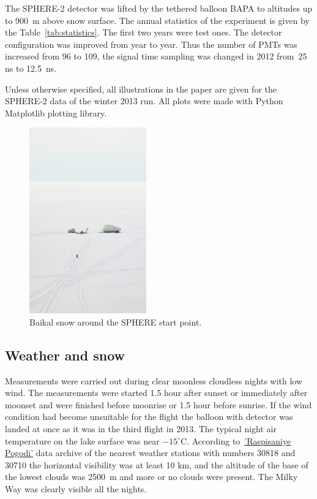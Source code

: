 \documentclass[final,5p,times,twocolumn]{elsarticle}
\begin{document}
The \mbox{SPHERE-2} detector was lifted by the tethered balloon BAPA to altitudes up to 900~m above snow surface. The annual statistics of the experiment is given by the Table~\ref{tab:statistics}. The first two years were test ones. The detector configuration was improved from year to year. Thus the number of PMTs was increased from 96 to 109, the signal time sampling was changed in 2012 from~25 ns to 12.5~ns.

Unless otherwise specified, all illustrations in the paper are given for the \mbox{SPHERE-2} data of the winter 2013 run. All plots were made with Python Matplotlib plotting library.

\begin{figure}[tb]
    \includegraphics[width=0.45\textwidth]{figs/DSC_4049.jpg}\hspace{2pc}%
    \caption{Baikal snow around the SPHERE start point.}
\label{fig:baikal_snow}
\end{figure}

\subsection{Weather and snow}

Measurements were carried out during clear moonless cloudless nights with low wind. The measurements were started 1.5 hour after sunset or immediately after moonset and were finished before moonrise or 1.5 hour before sunrise. If the wind condition had become unsuitable for the flight the balloon with detector was landed at once as it was in the third flight in 2013. The typical night air temperature on the lake surface was near $-15^\circ$C. According to~\href{https://rp5.ru/}{'Raspisaniye Pogodi'} data archive of the nearest weather stations with numbers 30818 and 30710 the horizontal visibility was at least 10 km, and the altitude of the base of the lowest clouds was 2500~m and more or no clouds were present. The Milky Way was clearly visible all the nights.
\end{document}
